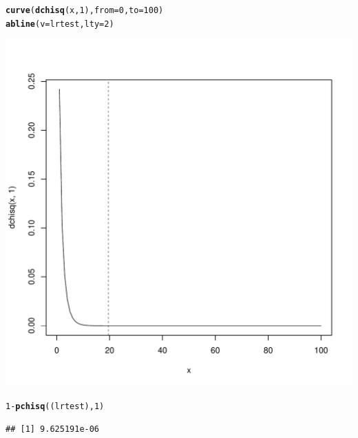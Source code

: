 \documentclass[12pt]{article}\usepackage[]{graphicx}\usepackage[]{color}
\makeatletter
\def\maxwidth{ %
  \ifdim\Gin@nat@width>\linewidth
    \linewidth
  \else
    \Gin@nat@width
  \fi
}
\newcommand{\hlnum}[1]{\textcolor[rgb]{0.686,0.059,0.569}{#1}}%
\newcommand{\hlopt}[1]{\textcolor[rgb]{0,0,0}{#1}}%
\newcommand{\hlstd}[1]{\textcolor[rgb]{0.345,0.345,0.345}{#1}}%
\newcommand{\hlkwc}[1]{\textcolor[rgb]{0.333,0.667,0.333}{#1}}%
\newcommand{\hlkwd}[1]{\textcolor[rgb]{0.737,0.353,0.396}{\textbf{#1}}}%
\newenvironment{kframe}{%
 \def\at@end@of@kframe{}%
 \ifinner\ifhmode%
  \def\at@end@of@kframe{\end{minipage}}%
  \begin{minipage}{\columnwidth}%
 \fi\fi%
 \def\FrameCommand##1{\hskip\@totalleftmargin \hskip-\fboxsep
 \colorbox{shadecolor}{##1}\hskip-\fboxsep
     \hskip-\linewidth \hskip-\@totalleftmargin \hskip\columnwidth}%
 \MakeFramed {\advance\hsize-\width
   \@totalleftmargin\z@ \linewidth\hsize
   \@setminipage}}%
 {\par\unskip\endMakeFramed%
 \at@end@of@kframe}
\newenvironment{knitrout}{}{} %
\makeatother
\begin{document}
\begin{knitrout}
\begin{kframe}
\begin{alltt}
\hlkwd{curve}\hlstd{(}\hlkwd{dchisq}\hlstd{(x,} \hlnum{1}\hlstd{),} \hlkwc{from} \hlstd{=} \hlnum{0}\hlstd{,} \hlkwc{to} \hlstd{=} \hlnum{100}\hlstd{)}
\hlkwd{abline}\hlstd{(}\hlkwc{v} \hlstd{= lrtest,} \hlkwc{lty} \hlstd{=} \hlnum{2}\hlstd{)}
\end{alltt}
\end{kframe}
\includegraphics[width=\maxwidth]{figure/unnamed-chunk-6-1} 
\begin{kframe}\begin{alltt}
\hlnum{1} \hlopt{-} \hlkwd{pchisq}\hlstd{((lrtest),} \hlnum{1}\hlstd{)}
\end{alltt}
\begin{verbatim}
## [1] 9.625191e-06
\end{verbatim}
\end{kframe}
\end{knitrout}
\end{document}
